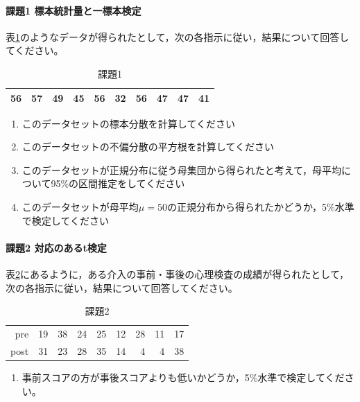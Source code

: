 \documentclass{ltjsbook}
\begin{document}
\paragraph{課題1 標本統計量と一標本検定}
表\ref{exe:20_1}のようなデータが得られたとして，次の各指示に従い，結果について回答してください。
\begin{table}[ht]
	\centering
	\caption{課題1}
	\label{exe:20_1}
	\begin{tabular}{rrrrrrrrrr}
		\hline
		56 & 57 & 49 & 45 & 56 & 32 & 56 & 47 & 47 & 41 \\
		\hline
	\end{tabular}
\end{table}
\begin{enumerate}
	\item このデータセットの標本分散を計算してください
	\item このデータセットの不偏分散の平方根を計算してください
	\item このデータセットが正規分布に従う母集団から得られたと考えて，母平均について95\%の区間推定をしてください
	\item このデータセットが母平均$\mu=50$の正規分布から得られたかどうか，5\%水準で検定してください
\end{enumerate}

\paragraph{課題2 対応のあるt検定}
表\ref{exe:20_2}にあるように，ある介入の事前・事後の心理検査の成績が得られたとして，次の各指示に従い，結果について回答してください。
\begin{table}[ht]
	\centering
	\caption{課題2}
	\label{exe:20_2}
	\begin{tabular}{rrrrrrrrr}
		\hline
		pre  & 19 & 38 & 24 & 25 & 12 & 28 & 11 & 17 \\
		post & 31 & 23 & 28 & 35 & 14 & 4  & 4  & 38 \\
		\hline
	\end{tabular}
\end{table}

\begin{enumerate}
	\item 事前スコアの方が事後スコアよりも低いかどうか，5\%水準で検定してください。
\end{enumerate}
\end{document}

